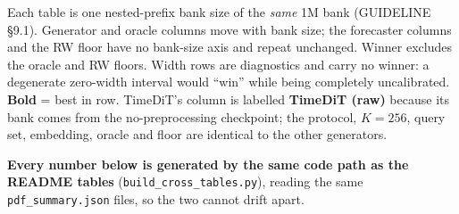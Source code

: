 \documentclass[11pt,a4paper]{article}
\begin{document}
Each table is one nested-prefix bank size of the \emph{same} 1M bank
(GUIDELINE \S9.1). Generator and oracle columns move with bank size; the
forecaster columns and the RW floor have no bank-size axis and repeat unchanged.
Winner excludes the oracle and RW floors. Width rows are diagnostics and carry
no winner: a degenerate zero-width interval would ``win'' while being completely
uncalibrated. \textbf{Bold} = best in row. TimeDiT's column is labelled
\textbf{TimeDiT (raw)} because its bank comes from the no-preprocessing
checkpoint; the protocol, $K=256$, query set, embedding, oracle and floor are
identical to the other generators.

\textbf{Every number below is generated by the same code path as the README
tables} (\texttt{build\_cross\_tables.py}), reading the same
\texttt{pdf\_summary.json} files, so the two cannot drift apart.
\end{document}
